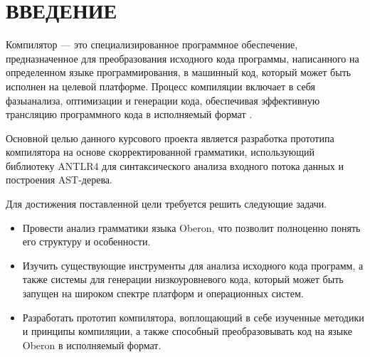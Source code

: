 \part*{ВВЕДЕНИЕ}
Компилятор — это специализированное программное обеспечение, предназначенное для преобразования исходного кода программы, написанного на определенном языке программирования, в машинный код, который может быть исполнен на целевой платформе. Процесс компиляции включает в себя фазыанализа, оптимизации и генерации кода, обеспечивая эффективную трансляцию программного кода в исполняемый формат \cite{book1}.

Основной целью данного курсового проекта является разработка прототипа компилятора на основе скорректированной грамматики, использующий библиотеку ANTLR4 для синтаксического анализа входного потока данных и
построения AST-дерева.

Для достижения поставленной цели требуется решить следующие задачи.
\begin{itemize}[label = ---]
    \item Провести анализ грамматики языка Oberon, что позволит полноценно понять его структуру и особенности.
    \item Изучить существующие инструменты для анализа исходного кода программ, а также системы для генерации низкоуровневого кода, который может быть запущен на широком спектре платформ и операционных систем.
    \item Разработать прототип компилятора, воплощающий в себе изученные методики и принципы компиляции, а также способный преобразовывать код на языке Oberon в исполняемый формат.
\end{itemize}

